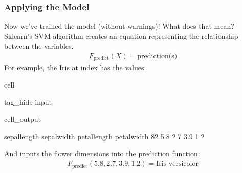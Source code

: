\documentclass[letterpaper,10pt,english]{jupyterBook}
\begin{document}
\subsubsection{Applying the Model}
\label{\detokenize{task2_c/example_sup_class/sup_class_ex-develop:applying-the-model}}
\sphinxAtStartPar
Now we’ve trained the model (without warnings)! What does that mean? Sklearn’s SVM algorithm creates an equation representing the relationship between the variables.
\begin{equation*}
\begin{split}F_{\text{predict}}(X)=\text{prediction(s)}\end{split}
\end{equation*}
\sphinxAtStartPar
For example, the Iris at index  has the values:

\begin{sphinxuseclass}{cell}
\begin{sphinxuseclass}{tag_hide-input}\begin{sphinxVerbatimOutput}

\begin{sphinxuseclass}{cell_output}
\begin{sphinxVerbatim}[commandchars=\\\{\}]
    sepal\PYGZhy{}length  sepal\PYGZhy{}width  petal\PYGZhy{}length  petal\PYGZhy{}width
82           5.8          2.7           3.9          1.2
\end{sphinxVerbatim}

\end{sphinxuseclass}\end{sphinxVerbatimOutput}

\end{sphinxuseclass}
\end{sphinxuseclass}
\sphinxAtStartPar
And  inputs the flower dimensions into the prediction function:
\begin{equation*}
\begin{split}F_{\text{predict}}(5.8, 2.7, 3.9, 1.2)=\text{Iris-versicolor}\end{split}
\end{equation*}
\end{document}
